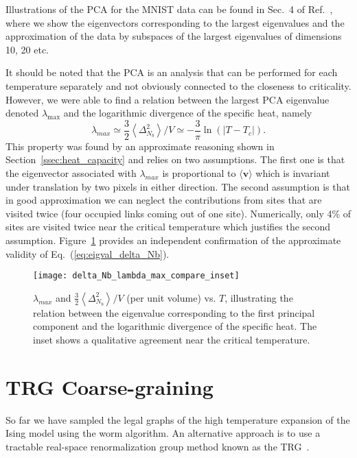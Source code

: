 \documentclass[../main.tex]{subfiles}
\begin{document}
Illustrations of the PCA for the MNIST data can be found in Sec.~4 of
Ref.~\cite{foreman2017}, where we show the eigenvectors corresponding to the
largest eigenvalues and the approximation of the data by subspaces of the
largest eigenvalues of dimensions 10, 20 etc. 

It should be noted that the PCA is an analysis that can be performed for each
temperature separately and not obviously connected to the closeness to
criticality.
%
However, we were able to find a relation between the largest PCA eigenvalue
denoted $\lambda_{\max}$ and the logarithmic divergence of the specific heat,
namely
%
\begin{equation}
    \lambda_{max} \simeq \frac{3}{2}\left \langle \Delta_{N_b}^2
    \right\rangle/V\simeq -\frac{3}{\pi}\ln(|T-T_c|).
    \label{eq:eigval_delta_Nb}
\end{equation}
%
This property was found by an approximate reasoning shown in
Section~\ref{ssec:heat_capacity} and relies on two assumptions.
%
The first one is that the eigenvector associated with $\lambda_{max}$ is
proportional to $\langle \mathbf{v}\rangle$ which is invariant under
translation by two pixels in either direction.
%
The second assumption is that in good approximation we can neglect the
contributions from sites that are visited twice (four occupied links coming out
of one site).
%
Numerically, only 4\% of sites are visited twice near the critical temperature
which justifies the second assumption.
Figure~\ref{fig:eigval_fluctuations_unblocked} provides an independent
confirmation of the approximate validity of Eq.~(\ref{eq:eigval_delta_Nb}). 
%
\begin{figure}[htpb]
 \centering
 \texttt{[image: delta\_Nb\_lambda\_max\_compare\_inset]}
	\hfill
 \caption{$\lambda_{max}$ and $\frac{3}{2}\left \langle \Delta_{N_b}^2
		\right\rangle / V$ (per unit volume) vs. $T$, illustrating the relation
		between the eigenvalue corresponding to the first principal component and
		the logarithmic divergence of the specific heat. The inset shows a
		qualitative agreement near the critical temperature.}%
 \label{fig:eigval_fluctuations_unblocked}
\end{figure}
%
\section{TRG Coarse-graining}%
\label{sec:trg}
So far we  have sampled the legal graphs of the high temperature expansion of
the Ising model using the worm algorithm.
%
An alternative approach is to use a tractable real-space renormalization group
method known as the TRG~\cite{PhysRevB.86.045139,prb87,prd88,prd89,pre89}. 
\end{document}
